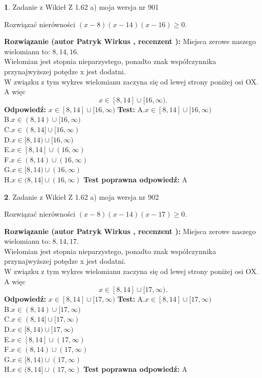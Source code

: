 \documentclass[12pt, a4paper]{article}
\theoremstyle{definition} %
\newtheorem{zad}{}
\newcommand{\zadStart}[1]{\begin{zad}#1\newline}
\newcommand{\zadStop}{\end{zad}}
\newcommand{\rozwStart}[2]{\noindent \textbf{Rozwiązanie (autor #1 , recenzent #2): }\newline}
\newcommand{\rozwStop}{\newline}
\newcommand{\odpStart}{\noindent \textbf{Odpowiedź:}\newline}
\newcommand{\odpStop}{\newline}
\newcommand{\testStart}{\noindent \textbf{Test:}\newline}
\newcommand{\testStop}{\newline}
\newcommand{\kluczStart}{\noindent \textbf{Test poprawna odpowiedź:}\newline}
\newcommand{\kluczStop}{\newline}
\begin{document}
\zadStart{Zadanie z Wikieł Z 1.62 a) moja wersja nr 901}

Rozwiązać nierówności $(x-8)(x-14)(x-16)\ge0$.
\zadStop
\rozwStart{Patryk Wirkus}{}
Miejsca zerowe naszego wielomianu to: $8, 14, 16$.\\
Wielomian jest stopnia nieparzystego, ponadto znak współczynnika przy\linebreak najwyższej potędze x jest dodatni.\\ W związku z tym wykres wielomianu zaczyna się od lewej strony poniżej osi OX. A więc $$x \in [8,14] \cup [16,\infty).$$
\rozwStop
\odpStart
$x \in [8,14] \cup [16,\infty)$
\odpStop
\testStart
A.$x \in [8,14] \cup [16,\infty)$\\
B.$x \in (8,14) \cup [16,\infty)$\\
C.$x \in (8,14] \cup [16,\infty)$\\
D.$x \in [8,14) \cup [16,\infty)$\\
E.$x \in [8,14] \cup (16,\infty)$\\
F.$x \in (8,14) \cup (16,\infty)$\\
G.$x \in [8,14) \cup (16,\infty)$\\
H.$x \in (8,14] \cup (16,\infty)$
\testStop
\kluczStart
A
\kluczStop



\zadStart{Zadanie z Wikieł Z 1.62 a) moja wersja nr 902}

Rozwiązać nierówności $(x-8)(x-14)(x-17)\ge0$.
\zadStop
\rozwStart{Patryk Wirkus}{}
Miejsca zerowe naszego wielomianu to: $8, 14, 17$.\\
Wielomian jest stopnia nieparzystego, ponadto znak współczynnika przy\linebreak najwyższej potędze x jest dodatni.\\ W związku z tym wykres wielomianu zaczyna się od lewej strony poniżej osi OX. A więc $$x \in [8,14] \cup [17,\infty).$$
\rozwStop
\odpStart
$x \in [8,14] \cup [17,\infty)$
\odpStop
\testStart
A.$x \in [8,14] \cup [17,\infty)$\\
B.$x \in (8,14) \cup [17,\infty)$\\
C.$x \in (8,14] \cup [17,\infty)$\\
D.$x \in [8,14) \cup [17,\infty)$\\
E.$x \in [8,14] \cup (17,\infty)$\\
F.$x \in (8,14) \cup (17,\infty)$\\
G.$x \in [8,14) \cup (17,\infty)$\\
H.$x \in (8,14] \cup (17,\infty)$
\testStop
\kluczStart
A
\kluczStop
\end{document}
